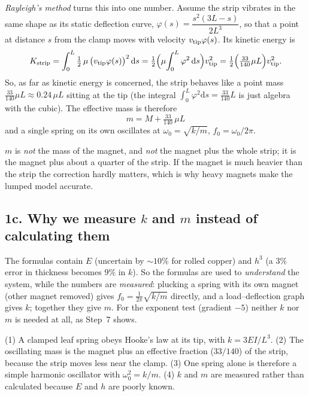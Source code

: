 \documentclass[11pt,a4paper]{article}
\newcommand{\dd}{\mathrm{d}}
\begin{document}
\emph{Rayleigh's method} turns this into one number. Assume the strip vibrates in the same shape as its static deflection curve, $\varphi(s)=\dfrac{s^2(3L-s)}{2L^3}$, so that a point at distance $s$ from the clamp moves with velocity $v_{\rm tip}\varphi(s)$. Its kinetic energy is
\begin{equation}
K_{\rm strip}=\int_0^L\tfrac12\,\mu\,\big(v_{\rm tip}\varphi(s)\big)^2\,\dd s
=\tfrac12\Big(\mu\!\int_0^L\varphi^2\,\dd s\Big)v_{\rm tip}^2
=\tfrac12\Big(\tfrac{33}{140}\mu L\Big)v_{\rm tip}^2 .
\end{equation}
So, as far as kinetic energy is concerned, the strip behaves like a point mass $\tfrac{33}{140}\mu L\approx0.24\,\mu L$ sitting at the tip (the integral $\int_0^L\varphi^2\dd s=\tfrac{33}{140}L$ is just algebra with the cubic). The effective mass is therefore
\begin{equation}
\boxed{m=M+\tfrac{33}{140}\,\mu L}
\end{equation}
and a single spring on its own oscillates at $\omega_0=\sqrt{k/m}$, $f_0=\omega_0/2\pi$.

\begin{pitfall}
$m$ is \emph{not} the mass of the magnet, and \emph{not} the magnet plus the whole strip; it is the magnet plus about a quarter of the strip. If the magnet is much heavier than the strip the correction hardly matters, which is why heavy magnets make the lumped model accurate.
\end{pitfall}

\subsection*{1c. Why we measure $k$ and $m$ instead of calculating them}
The formulas contain $E$ (uncertain by $\sim10\%$ for rolled copper) and $h^3$ (a $3\%$ error in thickness becomes $9\%$ in $k$). So the formulas are used to \emph{understand} the system, while the numbers are \emph{measured}: plucking a spring with its own magnet (other magnet removed) gives $f_0=\frac1{2\pi}\sqrt{k/m}$ directly, and a load--deflection graph gives $k$; together they give $m$. For the exponent test (gradient $-5$) neither $k$ nor $m$ is needed at all, as Step~7 shows.

\begin{ownwords}
(1) A clamped leaf spring obeys Hooke's law at its tip, with $k=3EI/L^3$. (2) The oscillating mass is the magnet plus an effective fraction ($33/140$) of the strip, because the strip moves less near the clamp. (3) One spring alone is therefore a simple harmonic oscillator with $\omega_0^2=k/m$. (4) $k$ and $m$ are measured rather than calculated because $E$ and $h$ are poorly known.
\end{ownwords}
\end{document}

